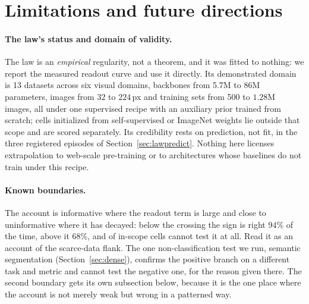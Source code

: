 \section{Limitations and future directions}\label{sec:limits}

\paragraph{The law's status and domain of validity.} The law is an
\emph{empirical} regularity, not a theorem, and it was fitted to nothing: we
report the measured readout curve and use it directly. Its demonstrated domain
is 13 datasets across six visual domains, backbones from 5.7M to 86M
parameters, images from $32$ to $224$\,px and training sets from 500 to
$1.28$M images, all under one supervised recipe with an auxiliary prior
trained from scratch; cells initialized from self-supervised or ImageNet
weights lie outside that scope and are scored separately. Its credibility rests on prediction, not fit, in the three registered episodes of
Section~\ref{sec:lawpredict}. Nothing here licenses extrapolation to web-scale
pre-training or to architectures whose baselines do not train under this
recipe.

\paragraph{Known boundaries.} The account is informative where the readout
term is large and close to uninformative where it has decayed: below the
crossing the sign is right $94\%$ of the time, above it $68\%$, and
\auditUnresolved{} of \auditScope{} in-scope cells cannot test it at all. Read
it as an account of the scarce-data flank. The one non-classification test we
run, semantic segmentation (Section~\ref{sec:dense}), confirms the positive
branch on a different task and metric and cannot test the negative one, for
the reason given there. The second boundary gets its own subsection below,
because it is the one place where the account is not merely weak but wrong in
a patterned way.

